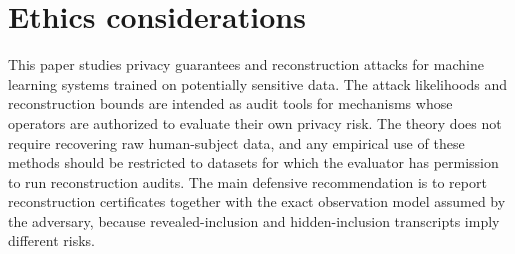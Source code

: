\documentclass[conference,compsoc]{IEEEtran}
\begin{document}
\section{Ethics considerations}
\label{app:ethics}

This paper studies privacy guarantees and reconstruction attacks for machine
learning systems trained on potentially sensitive data.  The attack likelihoods
and reconstruction bounds are intended as audit tools for mechanisms whose
operators are authorized to evaluate their own privacy risk.  The theory does
not require recovering raw human-subject data, and any empirical use of these
methods should be restricted to datasets for which the evaluator has permission
to run reconstruction audits.  The main defensive recommendation is to report
reconstruction certificates together with the exact observation model assumed by
the adversary, because revealed-inclusion and hidden-inclusion transcripts imply
different risks.
\end{document}
